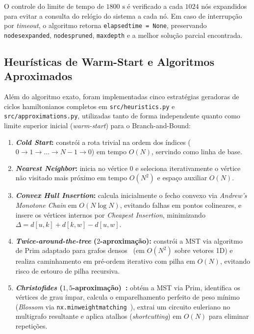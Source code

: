 \documentclass[12pt,a4paper]{article}
\renewcommand{\_}{\origunderscore\hspace{0pt}}
\begin{document}
O controle do limite de tempo de $1800\text{ s}$ é verificado a cada $1024$ nós expandidos para evitar a consulta do relógio do sistema a cada nó. Em caso de interrupção por \textit{timeout}, o algoritmo retorna \texttt{elapsed\_time = None}, preservando \texttt{nodes\_expanded}, \texttt{nodes\_pruned}, \texttt{max\_depth} e a melhor solução parcial encontrada.

\subsection{Heurísticas de Warm-Start e Algoritmos Aproximados}
Além do algoritmo exato, foram implementadas cinco estratégias geradoras de ciclos hamiltonianos completos em \texttt{src/heuristics.py} e \texttt{src/approximations.py}, utilizadas tanto de forma independente quanto como limite superior inicial (\textit{warm-start}) para o Branch-and-Bound:
\begin{enumerate}
    \item \textbf{\textit{Cold Start}:} constrói a rota trivial na ordem dos índices ($0 \to 1 \to \dots \to N-1 \to 0$) em tempo $O(N)$, servindo como linha de base.
    \item \textbf{\textit{Nearest Neighbor}:} inicia no vértice $0$ e seleciona iterativamente o vértice não visitado mais próximo em tempo $O(N^2)$ e espaço auxiliar $O(N)$.
    \item \textbf{\textit{Convex Hull Insertion}:} calcula inicialmente o fecho convexo via \textit{Andrew's Monotone Chain} em $O(N \log N)$, evitando falhas em pontos colineares, e insere os vértices internos por \textit{Cheapest Insertion}, minimizando $\Delta = d[u, k] + d[k, w] - d[u, w]$.
    \item \textbf{\textit{Twice-around-the-tree} ($2$-aproximação):} constrói a MST via algoritmo de Prim adaptado para grafos densos~\cite{coutinho2026, cormen2009} (em $O(N^2)$ sobre vetores 1D) e realiza caminhamento em pré-ordem iterativo com pilha em $O(N)$, evitando risco de estouro de pilha recursiva.
    \item \textbf{\textit{Christofides} ($1{,}5$-aproximação)~\cite{christofides1976}:} obtém a MST via Prim, identifica os vértices de grau ímpar, calcula o emparelhamento perfeito de peso mínimo (\textit{Blossom} via \texttt{nx.min\_weight\_matching}~\cite{networkx_docs}), extrai um circuito euleriano no multigrafo resultante e aplica atalhos (\textit{shortcutting}) em $O(N)$ para eliminar repetições.
\end{enumerate}
\end{document}
